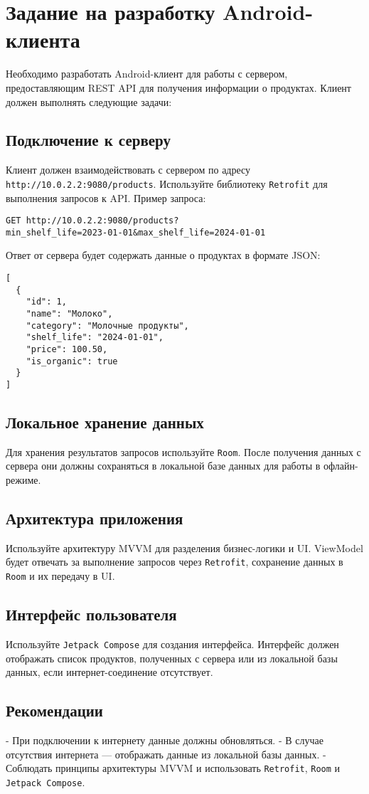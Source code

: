 \section{Задание на разработку Android-клиента}

Необходимо разработать Android-клиент для работы с сервером, предоставляющим REST API для получения информации о продуктах. Клиент должен выполнять следующие задачи:

\subsection{Подключение к серверу}
Клиент должен взаимодействовать с сервером по адресу \texttt{http://10.0.2.2:9080/products}. Используйте библиотеку \texttt{Retrofit} для выполнения запросов к API. Пример запроса:

\begin{verbatim}
GET http://10.0.2.2:9080/products?
min_shelf_life=2023-01-01&max_shelf_life=2024-01-01
\end{verbatim}

Ответ от сервера будет содержать данные о продуктах в формате JSON:

\begin{verbatim}
[
  {
    "id": 1,
    "name": "Молоко",
    "category": "Молочные продукты",
    "shelf_life": "2024-01-01",
    "price": 100.50,
    "is_organic": true
  }
]
\end{verbatim}

\subsection{Локальное хранение данных}
Для хранения результатов запросов используйте \texttt{Room}. После получения данных с сервера они должны сохраняться в локальной базе данных для работы в офлайн-режиме.

\subsection{Архитектура приложения}
Используйте архитектуру MVVM для разделения бизнес-логики и UI. ViewModel будет отвечать за выполнение запросов через \texttt{Retrofit}, сохранение данных в \texttt{Room} и их передачу в UI.

\subsection{Интерфейс пользователя}
Используйте \texttt{Jetpack Compose} для создания интерфейса. Интерфейс должен отображать список продуктов, полученных с сервера или из локальной базы данных, если интернет-соединение отсутствует.

\subsection{Рекомендации}
- При подключении к интернету данные должны обновляться.
- В случае отсутствия интернета — отображать данные из локальной базы данных.
- Соблюдать принципы архитектуры MVVM и использовать \texttt{Retrofit}, \texttt{Room} и \texttt{Jetpack Compose}.
